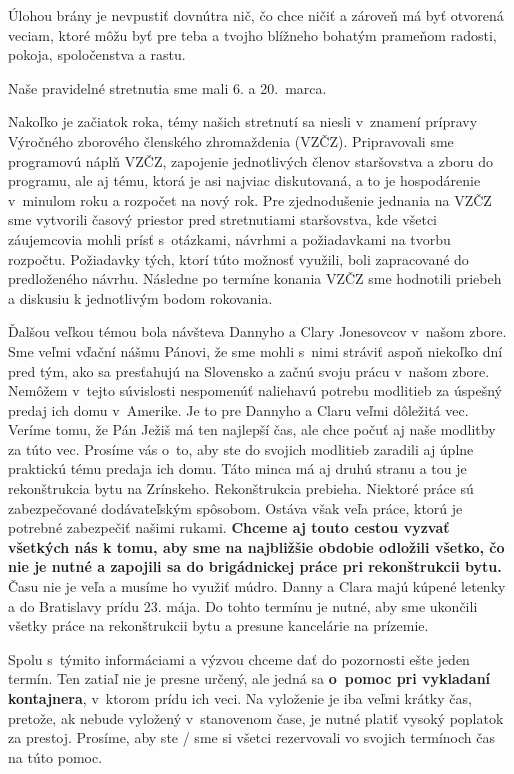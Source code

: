 Úlohou brány je nevpustiť dovnútra nič, čo chce ničiť a zároveň má byť otvorená veciam, ktoré môžu byť pre teba a tvojho blížneho bohatým prameňom radosti, pokoja, spoločenstva a rastu.



Naše pravidelné stretnutia sme mali 6. a 20.~marca.

Nakoľko je začiatok roka, témy našich stretnutí sa niesli v~znamení prípravy Výročného zborového členského zhromaždenia (VZČZ). Pripravovali sme programovú náplň VZČZ, zapojenie jednotlivých členov staršovstva a zboru do programu, ale aj tému, ktorá je asi najviac diskutovaná, a to je hospodárenie v~minulom roku a rozpočet na nový rok. Pre zjednodušenie jednania na VZČZ sme vytvorili časový priestor pred stretnutiami staršovstva, kde všetci záujemcovia mohli prísť s~otázkami, návrhmi a požiadavkami na tvorbu rozpočtu. Požiadavky tých, ktorí túto možnosť využili, boli zapracované do predloženého návrhu.
Následne po termíne konania VZČZ sme hodnotili priebeh a diskusiu k jednotlivým bodom rokovania.

Ďalšou veľkou témou bola návšteva Dannyho a Clary Jonesovcov v~našom zbore. Sme veľmi vďační nášmu Pánovi, že sme mohli s~nimi stráviť aspoň niekoľko dní pred tým, ako sa presťahujú na Slovensko a začnú svoju prácu v~našom zbore. Nemôžem v~tejto súvislosti nespomenúť naliehavú potrebu modlitieb za úspešný predaj ich domu v~Amerike. Je to pre Dannyho a Claru veľmi dôležitá vec. Veríme tomu, že Pán Ježiš má ten najlepší čas, ale chce počuť aj naše modlitby za túto vec. Prosíme vás o~to, aby ste do svojich modlitieb zaradili aj úplne praktickú tému predaja ich domu.
Táto minca má aj druhú stranu a tou je rekonštrukcia bytu na Zrínskeho. Rekonštrukcia prebieha. Niektoré práce sú zabezpečované dodávateľským spôsobom. Ostáva však veľa práce, ktorú je potrebné zabezpečiť našimi rukami. {\bf Chceme aj touto cestou vyzvať všetkých nás k tomu, aby sme na najbližšie obdobie odložili všetko, čo nie je nutné a zapojili sa do brigádnickej práce pri rekonštrukcii bytu.} Času nie je veľa a musíme ho využiť múdro.
Danny a Clara majú kúpené letenky a do Bratislavy prídu 23. mája. Do tohto termínu je nutné, aby sme ukončili všetky práce na rekonštrukcii bytu a presune kancelárie na prízemie.

Spolu s~týmito informáciami a výzvou chceme dať do pozornosti ešte jeden termín. Ten zatiaľ nie je presne určený, ale jedná sa {\bf o~pomoc pri vykladaní kontajnera}, v~ktorom prídu ich veci. Na vyloženie je iba veľmi krátky čas, pretože, ak nebude vyložený v~stanovenom čase, je nutné platiť vysoký poplatok za prestoj. Prosíme, aby ste / sme si všetci rezervovali vo svojich termínoch čas na túto pomoc.

